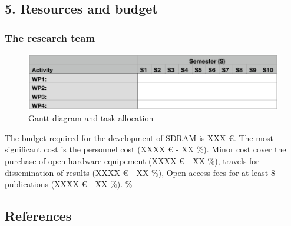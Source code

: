 \documentclass[
  11pt,
  a4paperpaper,
  onecolumn]{article}
\begin{document}
\hypertarget{resources-and-budget}{%
\subsection{5. Resources and budget}\label{resources-and-budget}}

\hypertarget{the-research-team}{%
\subsubsection{The research team}\label{the-research-team}}

\begin{figure}
\centering
    \includegraphics[width=0.9\linewidth]{Gantt/Gantt-B1.pdf}
    \caption{Gantt diagram and task allocation}
    \label{fig:gantt-b1}
\end{figure}

The budget required for the development of SDRAM is XXX €. The most
significant cost is the personnel cost (XXXX € - XX \%). Minor cost
cover the purchase of open hardware equipement (XXXX € - XX \%), travels
for dissemination of results (XXXX € - XX \%), Open access fees for at
least 8 publications (XXXX € - XX \%). \%

\newpage

\hypertarget{references}{%
\subsection*{References}\label{references}}
\end{document}
